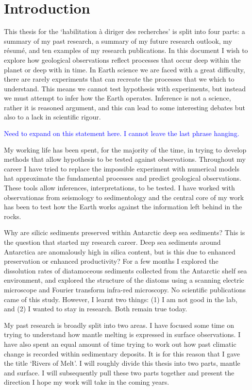 \chapter{Introduction}

This thesis for the `habilitation à diriger des recherches' is split into four parts: a summary of my past research, a summary of my future research outlook, my résumé, and ten examples of my research publications. In this document I wish to explore how geological observations reflect processes that occur deep within the planet or deep with in time. In Earth science we are faced with a great difficulty, there are rarely experiments that can recreate the processes that we which to understand. This means we cannot test hypothesis with experiments, but instead we must attempt to infer how the Earth operates. Inference is not a science, rather it is reasoned argument, and this can lead to some interesting debates but also to a lack in scientific rigour.

\textcolor{blue}{Need to expand on this statement here. I cannot leave the last phrase hanging.}

My working life has been spent, for the majority of the time, in trying to develop methods that allow hypothesis to be tested against observations. Throughout my career I have tried to replace the impossible experiment with numerical models hat approximate the fundamental processes and predict geological observations. These tools allow inferences, interpretations, to be tested. I have worked with observationas from seismology to sedimentology and the central core of my work has been to test how the Earth works against the information left behind in the rocks.

Why are silicic sediments preserved within Antarctic deep sea sediments? This is the question that started my research career. Deep sea sediments around Antarctica are anomalously high in silica content, but is this due to enhanced preservation or enhanced productivity? For a few months I explored the dissolution rates of diatamoceous sediments collected from the Antarctic shelf sea environment, and explored the structure of the diatoms using a scanning electric microscope and Fourier transform infra-red microscopy. No scientific publications came of this study. However, I learnt two things: (1) I am not good in the lab, and (2) I wanted to stay in research. Both remain true today.

My past research is broadly split into two areas. I have focused some time on trying to understand how mantle melting is expressed in surface observations. I have also spent an equal amount of time trying to work out how past climatic change is recorded within sedimentary deposits. It is for this reason that I gave the title `Rivers of Melt'. I will roughly divide this thesis into two parts, mantle and surface. I will subsequently pull these two parts together and present the direction I hope my work will take in the coming years.
